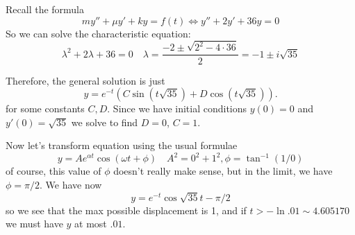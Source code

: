 \documentclass[14pt]{article}
\begin{document}
Recall the formula
\[ m y'' + \mu y' + k y = f(t) \Leftrightarrow y'' + 2 y' + 36 y =0\]
So we can solve the characteristic equation:
\[\lambda^2 + 2 \lambda + 36 = 0 \quad \lambda = \frac{-2 \pm \sqrt{2^2 - 4 \cdot 36}}{2} = -1 \pm  i \sqrt{35}\]

Therefore, the general solution is just
\[y = e^{-t} ( C \sin{(t\sqrt{35})} + D \cos{(t\sqrt{35})} ).\]
for some constants $C,D$. Since we have initial conditions $y(0) = 0$ and $y'(0) = \sqrt{35}$ we solve to find $D = 0$, $C = 1$. 

Now let's transform equation using the usual formulae
\[y = A e^{\alpha t}  \cos{(\omega t + \phi)} \quad A^2 = 0^2 + 1^2 , \phi = \tan^{-1}(1/0)\]
of course, this value of $\phi$ doesn't really make sense, but in the limit, we have $\phi = \pi/ 2$. We have now
\[ y =  e^{ -t} \cos{\sqrt{35} t - \pi /2}\]
so we see that the max possible displacement is 1, and if $t > - \ln .01 \sim 4.605170$ we must have $y$ at most $.01$.
\end{document}
